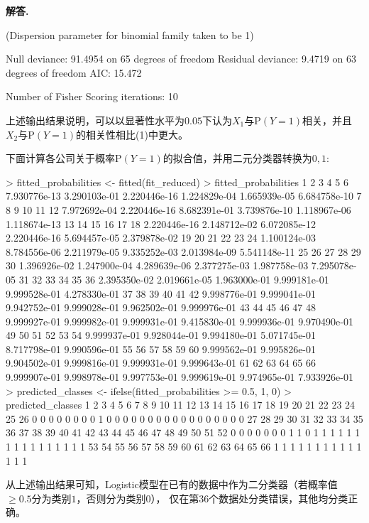 \documentclass[12pt, a4paper, oneside]{ctexart}
\let\geq=\geqslant %
\newenvironment{solution}[1][]{\par\noindent\textbf{#1解答. }}{\smallskip\par}  %
\def\P{\textrm{P}}          %
\begin{document}
\begin{solution}
\begin{rcode}
(Dispersion parameter for binomial family taken to be 1)

    Null deviance: 91.4954  on 65  degrees of freedom
Residual deviance:  9.4719  on 63  degrees of freedom
AIC: 15.472

Number of Fisher Scoring iterations: 10
    \end{rcode}
    上述输出结果说明，可以以显著性水平为$0.05$下认为$X_1$与$\P(Y=1)$相关，并且$X_2$与$\P(Y=1)$的相关性相比(1)中更大。

    下面计算各公司关于概率$\P(Y=1)$的拟合值，并用二元分类器转换为$0,1$:
    \begin{rcode}
> fitted_probabilities <- fitted(fit_reduced)
> fitted_probabilities
           1            2            3            4            5            6 
7.930776e-13 3.290103e-01 2.220446e-16 1.224829e-04 1.665939e-05 6.684758e-10 
           7            8            9           10           11           12 
7.972692e-04 2.220446e-16 8.682391e-01 3.739876e-10 1.118967e-06 1.118674e-13 
          13           14           15           16           17           18 
2.220446e-16 2.148712e-02 6.072085e-12 2.220446e-16 5.694457e-05 2.379878e-02 
          19           20           21           22           23           24 
1.100124e-03 8.784556e-06 2.211979e-05 9.335252e-03 2.013984e-09 5.541148e-11 
          25           26           27           28           29           30 
1.396926e-02 1.247900e-04 4.289639e-06 2.377275e-03 1.987758e-03 7.295078e-05 
          31           32           33           34           35           36 
2.395350e-02 2.019661e-05 1.963000e-01 9.999181e-01 9.999528e-01 4.278330e-01 
          37           38           39           40           41           42 
9.998776e-01 9.999041e-01 9.942752e-01 9.999028e-01 9.962502e-01 9.999976e-01 
          43           44           45           46           47           48 
9.999927e-01 9.999982e-01 9.999931e-01 9.415830e-01 9.999936e-01 9.970490e-01 
          49           50           51           52           53           54 
9.999937e-01 9.928044e-01 9.994180e-01 5.071745e-01 8.717798e-01 9.990596e-01 
          55           56           57           58           59           60 
9.999562e-01 9.995826e-01 9.904502e-01 9.999816e-01 9.999931e-01 9.999643e-01 
          61           62           63           64           65           66 
9.999907e-01 9.998978e-01 9.997753e-01 9.999619e-01 9.974965e-01 7.933926e-01 
> predicted_classes <- ifelse(fitted_probabilities >= 0.5, 1, 0)
> predicted_classes
    1  2  3  4  5  6  7  8  9 10 11 12 13 14 15 16 17 18 19 20 21 22 23 24 25 26 
    0  0  0  0  0  0  0  0  1  0  0  0  0  0  0  0  0  0  0  0  0  0  0  0  0  0 
   27 28 29 30 31 32 33 34 35 36 37 38 39 40 41 42 43 44 45 46 47 48 49 50 51 52 
    0  0  0  0  0  0  0  1  1  0  1  1  1  1  1  1  1  1  1  1  1  1  1  1  1  1 
   53 54 55 56 57 58 59 60 61 62 63 64 65 66 
    1  1  1  1  1  1  1  1  1  1  1  1  1  1 
    \end{rcode}
    从上述输出结果可知，Logistic模型在已有的数据中作为二分类器（若概率值$\geq 0.5$分为类别$1$，否则分为类别$0$），
    仅在第36个数据处分类错误，其他均分类正确。


\end{solution}
\end{document}
